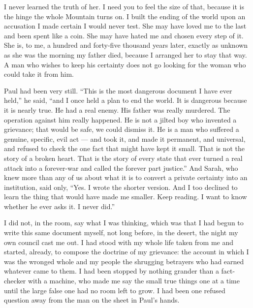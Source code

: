 I never learned the truth of her. I need you to feel the size of that, because it is the hinge the whole Mountain turns on. I built the ending of the world upon an accusation I made certain I would never test. She may have loved me to the last and been spent like a coin. She may have hated me and chosen every step of it. She is, to me, a hundred and forty-five thousand years later, exactly as unknown as she was the morning my father died, because I arranged her to stay that way. A man who wishes to keep his certainty does not go looking for the woman who could take it from him.\par

\ornament

Paul had been very still. ``This is the most dangerous document I have ever held,'' he said, ``and I once held a plan to end the world. It is dangerous because it is nearly true. He had a real enemy. His father was really murdered. The operation against him really happened. He is not a jilted boy who invented a grievance; that would be safe, we could dismiss it. He is a man who suffered a genuine, specific, evil act --- and took it, and made it permanent, and universal, and refused to check the one fact that might have kept it small. That is not the story of a broken heart. That is the story of every state that ever turned a real attack into a forever-war and called the forever part justice.'' And Sarah, who knew more than any of us about what it is to convert a private certainty into an institution, said only, ``Yes. I wrote the shorter version. And I too declined to learn the thing that would have made me smaller. Keep reading. I want to know whether he ever asks it. I never did.''\par

\ornament

I did not, in the room, say what I was thinking, which was that I had begun to write this same document myself, not long before, in the desert, the night my own council cast me out. I had stood with my whole life taken from me and started, already, to compose the doctrine of my grievance: the account in which I was the wronged whole and my people the shrugging betrayers who had earned whatever came to them. I had been stopped by nothing grander than a fact-checker with a machine, who made me say the small true things one at a time until the large false one had no room left to grow. I had been one refused question away from the man on the sheet in Paul's hands.\par

